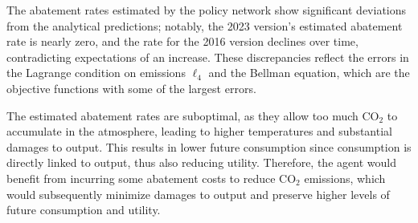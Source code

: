 The abatement rates estimated by the policy network show significant deviations from the analytical predictions; notably, the 2023 version's estimated abatement rate is nearly zero, and the rate for the 2016 version declines over time, contradicting expectations of an increase. These discrepancies reflect the errors in the Lagrange condition on emissions \(\ell_4\) and the Bellman equation, which are the objective functions with some of the largest errors. 

The estimated abatement rates are suboptimal, as they allow too much CO$_2$ to accumulate in the atmosphere, leading to higher temperatures and substantial damages to output. This results in lower future consumption since consumption is directly linked to output, thus also reducing utility. Therefore, the agent would benefit from incurring some abatement costs to reduce CO$_2$ emissions, which would subsequently minimize damages to output and preserve higher levels of future consumption and utility.